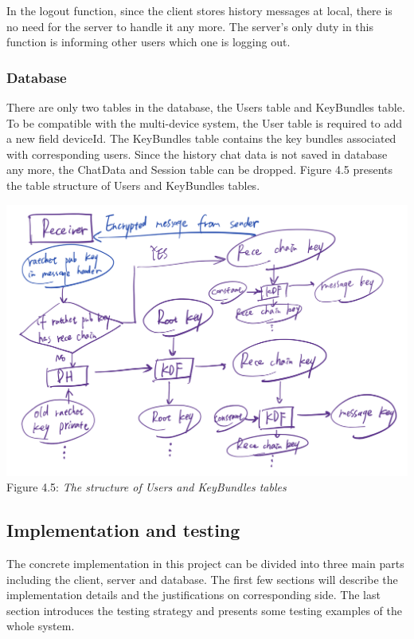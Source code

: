In the logout function, since the client stores history messages at local, there is no need for the server to handle it any more. The server's only duty in this function is informing other users which one is logging out.
\subsubsection{Database}
There are only two tables in the database, the Users table and KeyBundles table. To be compatible with the multi-device system, the User table is required to add a new field deviceId. The KeyBundles table contains the key bundles associated with corresponding users. Since the history chat data is not saved in database any more, the ChatData and Session table can be dropped. Figure 4.5 presents the table structure of Users and KeyBundles tables.

\begin{center}
\includegraphics[scale=.5]{../3-Background/resources/DH-rece.png}\\
Figure 4.5: \textit{The structure of Users and KeyBundles tables}
\end{center}

\subsection{Implementation and testing}
The concrete implementation in this project can be divided into three main parts including the client, server and database. The first few sections will describe the implementation details and the justifications on corresponding side. The last section introduces the testing strategy and presents some testing examples of the whole system.
